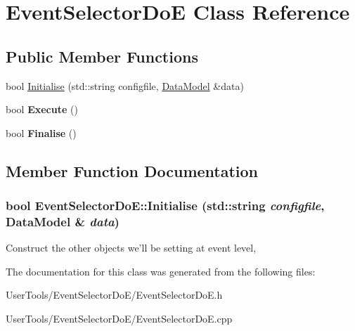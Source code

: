 \hypertarget{classEventSelectorDoE}{
\section{EventSelectorDoE Class Reference}
\label{classEventSelectorDoE}
}
\subsection*{Public Member Functions}
\begin{DoxyCompactItemize}
\item 
bool \hyperlink{classEventSelectorDoE_a9eef7438e552c60c6c11b3977d2f9210}{Initialise} (std::string configfile, \hyperlink{classDataModel}{DataModel} \&data)
\item 
\hypertarget{classEventSelectorDoE_afa76e234da6aef6333dca180b0a0e281}{
bool {\bfseries Execute} ()}
\label{classEventSelectorDoE_afa76e234da6aef6333dca180b0a0e281}

\item 
\hypertarget{classEventSelectorDoE_a2463b7db3877856bd0ce12b3e00dc8f9}{
bool {\bfseries Finalise} ()}
\label{classEventSelectorDoE_a2463b7db3877856bd0ce12b3e00dc8f9}

\end{DoxyCompactItemize}


\subsection{Member Function Documentation}
\hypertarget{classEventSelectorDoE_a9eef7438e552c60c6c11b3977d2f9210}{
\subsubsection[{Initialise}]{\setlength{\rightskip}{0pt plus 5cm}bool EventSelectorDoE::Initialise (std::string {\em configfile}, \/  {\bf DataModel} \& {\em data})}}
\label{classEventSelectorDoE_a9eef7438e552c60c6c11b3977d2f9210}


Construct the other objects we'll be setting at event level, 

The documentation for this class was generated from the following files:\begin{DoxyCompactItemize}
\item 
UserTools/EventSelectorDoE/EventSelectorDoE.h\item 
UserTools/EventSelectorDoE/EventSelectorDoE.cpp\end{DoxyCompactItemize}
